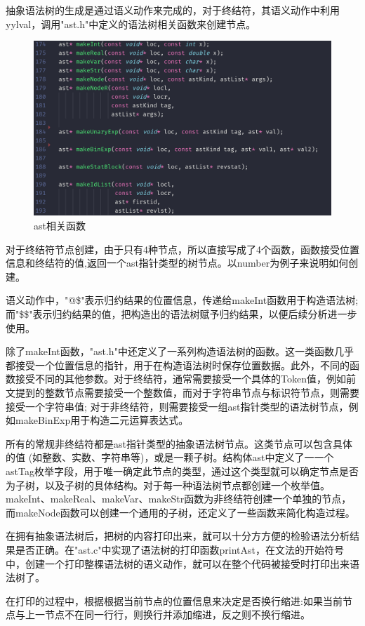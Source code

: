\documentclass{article}
\begin{document}
	抽象语法树的生成是通过语义动作来完成的，对于终结符，其语义动作中利用yylval，调用"ast.h"中定义的语法树相关函数来创建节点。
	\begin{figure}[H]
		\centering
		\includegraphics[width=0.7\linewidth]{astdefine}
		\caption{ast相关函数}
		\label{fig:astdefine}
	\end{figure}
	
	对于终结符节点创建，由于只有4种节点，所以直接写成了4个函数，函数接受位置信息和终结符的值,返回一个ast指针类型的树节点。以number为例子来说明如何创建。
		
	语义动作中，"@\$"表⽰归约结果的位置信息，传递给makeInt函数⽤于构造语法树;⽽"\$\$"表⽰归约结果的值，把构造出的语法树赋予归约结果，以便后续分析进一步使用。
	
	除了makeInt函数，"ast.h"中还定义了⼀系列构造语法树的函数。这⼀类函数几乎都接受一个位置信息的指针，用于在构造语法树时保存位置数据。此外，不同的函数接受不同的其他参数。对于终结符，通常需要接受⼀个具体的Token值，例如前⽂提到的整数节点需要接受一个整数值，而对于字符串节点与标识符节点，则需要接受一个字符串值;
	对于⾮终结符，则需要接受一组ast指针类型的语法树节点，例如makeBinExp用于构造⼆元运算表达式。
	
	所有的常规⾮终结符都是ast指针类型的抽象语法树节点。这类节点可以包含具体的值 (如整数、实数、字符串等)，或是一颗子树。结构体ast中定义了⼀一个 astTag枚举字段，⽤于唯⼀确定此节点的类型，通过这个类型就可以确定节点是否为⼦树，以及子树的具体结构。对于每一种语法树节点都创建一个枚举值。
	makeInt、makeReal、makeVar、makeStr函数为非终结符创建一个单独的节点，⽽makeNode函数可以创建⼀个通用的子树，还定义了一些函数来简化构造过程。
	
	在拥有抽象语法树后，把树的内容打印出来，就可以十分⽅方便的检验语法分析结果是否正确。在"ast.c"中实现了语法树的打印函数printAst，在文法的开始符号中，创建一个打印整棵语法树的语义动作，就可以在整个代码被接受时打印出来语法树了。
	
	在打印的过程中，根据根据当前节点的位置信息来决定是否换行缩进:如果当前节点与上一节点不在同一⾏行，则换⾏并添加缩进，反之则不换行缩进。
	
\end{document}
